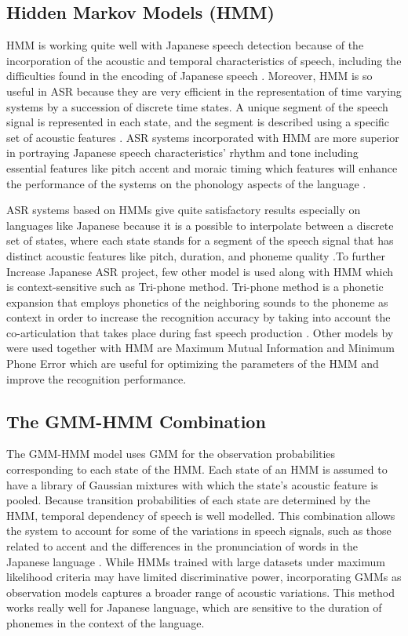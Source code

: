 \subsection{Hidden Markov Models (HMM)}
HMM is working quite well with Japanese speech detection because of the incorporation of the acoustic and temporal characteristics of speech, including the difficulties found in the encoding of Japanese speech \parencite{Tokuda1999Application}. Moreover, HMM is so useful in ASR because they are very efficient in the representation of time varying systems by a succession of discrete time states. A unique segment of the speech signal is represented in each state, and the segment is described using a specific set of acoustic features \parencite{juang1991hidden}. ASR systems incorporated with HMM are more superior in portraying Japanese speech characteristics’ rhythm and tone including essential features like pitch accent and moraic timing which features will enhance the performance of the systems on the phonology aspects of the language \parencite{Tokuda2000HMM}.

ASR systems based on HMMs give quite satisfactory results especially on languages like Japanese because it is a possible to interpolate between a discrete set of states, where each state stands for a segment of the speech signal that has distinct acoustic features like pitch, duration, and phoneme quality \parencite{juang1991hidden}.To further Increase Japanese ASR project, few other model is used along with HMM which is context-sensitive such as Tri-phone method. Tri-phone method is a phonetic expansion that employs phonetics of the neighboring sounds to the phoneme as context in order to increase the recognition accuracy by taking into account the co-articulation that takes place during fast speech production \parencite{Tokuda2000HMM}. Other models by \textcite{gales2008application} were used together with HMM are Maximum Mutual Information and Minimum Phone Error which are useful for optimizing the parameters of the HMM and improve the recognition performance. 


\subsection{The GMM-HMM Combination}
The GMM-HMM model uses GMM for the observation probabilities corresponding to each state of the HMM. Each state of an HMM is assumed to have a library of Gaussian mixtures with which the state’s acoustic feature is pooled. Because transition probabilities of each state are determined by the HMM, temporal dependency of speech is well modelled. This combination allows the system to account for some of the variations in speech signals, such as those related to accent and the differences in the pronunciation of words in the Japanese language \parencite{taheri2006fuzzy}. While HMMs trained with large datasets under maximum likelihood criteria may have limited discriminative power, incorporating GMMs as observation models captures a broader range of acoustic variations. This method works really well for Japanese language, which are sensitive to the duration of phonemes in the context of the language.

